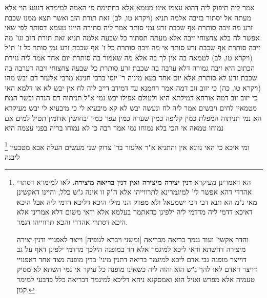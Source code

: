 \documentclass[12pt, openany]{book}
\newcommand{\footnotecomment}[1]{
	\renewcommand\thefootnote{}
	\footnote{#1}}
\newcommand{\commenta}[1]{\footnotecomment{#1}}
\begin{document}
{אמר ליה תיפוק ליה דהוא עצמו אינו מטמא אלא בחתימת פי האמה
למימרא דנוגע הוי אלא מעתה אל יסתור בזיבה 
אלמה תניא (ויקרא טו, לב) זאת תורת הזב ואשר תצא ממנו שכבת זרע מה זיבה סותרת אף שכבת זרע נמי סותר 
אמר ליה סתירה היינו טעמא דסותר לפי שאי אפשר לה בלא צחצוחי זיבה 
אלא מעתה תסתור כל שבעה אלמה תניא זאת תורת הזב וגו' מה זיבה סותרת אף שכבת זרע סותר
אי מה זיבה סותרת כל ז' אף שכבת זרע נמי סותר כל ז' ת"ל (ויקרא טו, לב) לטמאה בה אין לך בה אלא מה שאמור בה סותרת יום אחד 
אמר ליה גזירת הכתוב היא זיבה גמורה דלא ערבה בה שכבת זרע סותרת כל שבעה צחצוחי זיבה דערבה בה שכבת זרע לא סותרת אלא יום אחד 
בעא מיניה ר' יוסי ברבי חנינא מרבי אלעזר דם יבש מהו (ויקרא טו, כה) כי יזוב זוב דמה אמר רחמנא עד דמידב דייב ליה לח אין יבש לא או דלמא האי כי יזוב זוב דמה אורחא דמילתא היא ולעולם אפילו יבש נמי 
א"ל תניתוה דם הנדה ובשר המת מטמאין לחים ויבשים אמר ליה לח ונעשה יבש לא קא מיבעיא לי כי מיבעיא לי יבש מעיקרא 
הא נמי תניתוה המפלת כמין קליפה כמין שערה כמין עפר כמין יבחושין אדומין תטיל למים
אם נמוחו טמאה אי הכי בלא נמוחו נמי אמר רבה כי לא נמוחו בריה בפני עצמה היא 
\commenta{הא דאמרינן מעיקרא \textbf{דנין יצירה מיצירה ואין דנין בריאה מיצירה.} לאו למימרא דסתרי אהדדי דהא אפשר לי' למיגמרינא לתרווייהו אלא ה"ק זו אינה ג"ש כלל, והיינו דאקשינן מאי נ"מ הא תנא דבי רבי ישמעאל ולא מפרק הני מילי היכא דליכא דדמי ליה אבל היכא דאיכא דדמי ליה מדדמי ליה ילפינן כדאתמר בעלמא אלא ודאי משום דלא אמרינן אלא היכא דסתרי אהדדי והכא תרווייהו דגמר.\par והדר אקשי' ועוד נגמר בריאה מבריאה [ומשני ויברא לגופיה] וייצר לאפנויי ודנין יצירה מיצירה דהשתא ודאי ליכא למיגמר אלא חד במופנה הילכך מדדמי ילפינן דאף על גב דוייצר מופנה גבי אדם ליכא למיגמר בריאה דתנין מיני' בדין מופנה מצד אחד דאפנויי דויצר דאדם לאו להך ג"ש הוא והוה ליה כשאינו מופנה כל עיקר אי נמי השתא לא מסיק טעמיה אלא מפרש ואזיל הוא ואמסקנא ניחא דליכא למיגמר דבריאה כלל כדבעי למימר קמן. }
ומי איכא כי האי גוונא אין והתניא א"ר אלעזר בר' צדוק שני מעשים העלה אבא מטבעין ליבנה 
}
\end{document}
